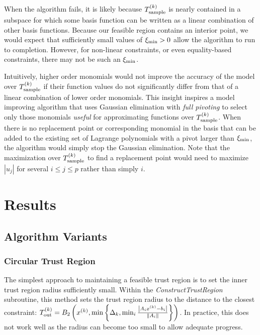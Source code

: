 When the algorithm fails, it is likely because ${T_{\text{sample}}^{(k)}}$ is nearly contained in a subspace 
for which some basis function can be written as a linear combination of other basis functions.
Because our feasible region contains an interior point, we would expect that sufficiently small values of $\xi_{\text{min}}>0$ allow the algorithm to run to completion.
However, for non-linear constraints, or even equality-based constraints, there may not be such an $\xi_{\text{min}}$.

Intuitively, higher order monomials would not improve the accuracy of the model over ${T_{\text{sample}}^{(k)}}$ 
if their function values do not significantly differ from that of a linear combination of lower order monomials.
This insight inspires a model improving algorithm that uses Gaussian elimination with {\em full pivoting}
to select only those monomials {\em useful} for approximating functions over ${T_{\text{sample}}^{(k)}}$.
When there is no replacement point or corresponding monomial in the basis that can be added to the existing set of Lagrange polynomials with a pivot larger than $\xi_{\text{min}}$,
the algorithm would simply stop the Gaussian elimination.
Note that the maximization over ${T_{\text{sample}}^{(k)}}$ to find a replacement point would need to maximize $|u_j|$ for several $i \le j \le p$ rather than simply $i$.


\section{Results}

\subsection{Algorithm Variants}

\subsubsection{Circular Trust Region}
The simplest approach to maintaining a feasible trust region is to set the inner trust region radius sufficiently small.
Within the \emph{ConstructTrustRegion} subroutine, this method sets the trust region radius to the distance to the closest constraint:
${T_{\text{out}}^{(k)}} = B_2\left(x^{(k)}, \min\left\{\Delta_k, \min_{i}\frac{\left|A_ix^{(k)} - b_i\right|}{\left\|A_i\right\|} \right\}\right)$.
In practice, this does not work well as the radius can become too small to allow adequate progress.

